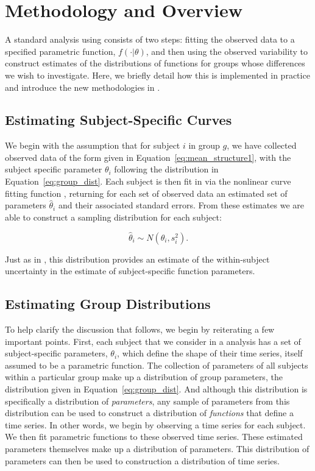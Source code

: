 \section{Methodology and Overview} 

A standard analysis using  consists of two steps: fitting the observed data to a specified parametric function, $f(\cdot|\theta)$, and then using the observed variability to construct estimates of the distributions of functions for groups whose differences we wish to investigate.  Here, we briefly detail how this is implemented in practice and introduce the new methodologies in . 



\subsection{Estimating Subject-Specific Curves}

We begin with the assumption that for subject $i$ in group $g$, we have collected observed data of the form given in Equation~\ref{eq:mean_structure1}, with the subject specific parameter $\theta_i$ following the distribution in Equation~\ref{eq:group_dist}. Each subject is then fit in  via the nonlinear curve fitting function , returning for each set of observed data an estimated set of parameters $\hat{\theta}_i$ and their associated standard errors. From these estimates we are able to construct a sampling distribution for each subject:

\begin{equation}\label{eq:sub_dist}
\hat{\theta}_i \sim N(\theta_i, s_i^2).
\end{equation}

Just as in \citet{oleson2017detecting}, this distribution provides an estimate of the within-subject uncertainty in the estimate of subject-specific function parameters.




\subsection{Estimating Group Distributions}\label{sec:group_dist}

To help clarify the discussion that follows, we begin by reiterating a few important points. First, each subject that we consider in a  analysis has a set of subject-specific parameters, $\theta_i$, which define the shape of their time series, itself assumed to be a parametric function. The collection of parameters of all subjects within a particular group make up a distribution of group parameters, the distribution given in Equation~\ref{eq:group_dist}. And although this distribution is specifically a distribution of \textit{parameters}, any sample of parameters from this distribution can be used to  construct a distribution of \textit{functions} that define a time series. In other words, we begin by observing a time series for each subject. We then fit parametric functions to these observed time series. These estimated parameters themselves make up a distribution of parameters. This distribution of parameters can then be used to construction a distribution of time series. 

